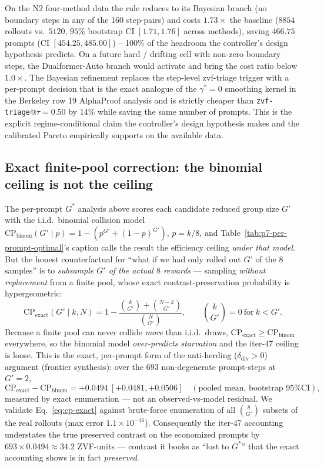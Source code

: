 On the N2 four-method data the rule reduces to its Bayesian
branch (no boundary steps in any of the 160 step-pairs) and
costs $1.73\times$ the baseline ($8854$ rollouts vs.\ $5120$,
$95\%$ bootstrap CI $[1.71, 1.76]$ across methods), saving
$466.75$ prompts (CI $[454.25, 485.00]$) -- 100\% of the
headroom the controller's design hypothesis predicts. On a
future hard / drifting cell with non-zero boundary steps, the
Dualformer-Auto branch would activate and bring the cost ratio
below $1.0\times$. The Bayesian refinement replaces the
step-level zvf-triage trigger with a per-prompt decision that
is the exact analogue of the $\gamma^*{=}0$ smoothing kernel
in the Berkeley row 19 AlphaProof analysis \citep{alphaproof2025nature}
and is strictly cheaper than \texttt{zvf-triage}@$\tau{=}0.50$
by 14\% while saving the same number of prompts. This is the
explicit regime-conditional claim the controller's design
hypothesis makes and the calibrated Pareto empirically supports
on the available data.

\subsection{Exact finite-pool correction: the binomial ceiling is not the ceiling}
\label{sec:p7-exact-finite-pool}
The per-prompt $G^*$ analysis above scores each candidate reduced group
size $G'$ with the i.i.d.\ binomial collision model
$\mathrm{CP}_\text{binom}(G'\!\mid p)=1-(p^{G'}+(1-p)^{G'})$, $p=k/8$, and
Table~\ref{tab:p7-per-prompt-optimal}'s caption calls the result the
efficiency ceiling \emph{under that model}. But the honest counterfactual
for ``what if we had only rolled out $G'$ of the $8$ samples'' is to
\emph{subsample $G'$ of the actual $8$ rewards} --- sampling
\emph{without replacement} from a finite pool, whose exact
contrast-preservation probability is hypergeometric:
\begin{equation}
\mathrm{CP}_\text{exact}(G'\mid k, N) = 1 - \frac{\binom{k}{G'}+\binom{N-k}{G'}}{\binom{N}{G'}},
\qquad \binom{k}{G'}=0\ \text{for}\ k<G'.
\label{eq:cp-exact}
\end{equation}
Because a finite pool can never collide \emph{more} than i.i.d.\ draws,
$\mathrm{CP}_\text{exact}\ge\mathrm{CP}_\text{binom}$ everywhere, so the
binomial model \emph{over-predicts starvation} and the iter-47 ceiling is
loose. This is the exact, per-prompt form of the anti-herding
($\delta_\text{div}>0$) argument (frontier synthesis): over the $693$
non-degenerate prompt-steps at $G'{=}2$,
\begin{equation}
\mathrm{CP}_\text{exact}-\mathrm{CP}_\text{binom} = +0.0494\ [+0.0481, +0.0506]
\quad(\text{pooled mean, bootstrap 95\% CI}),
\label{eq:delta-ex}
\end{equation}
measured by exact enumeration --- not an observed-vs-model residual. We
validate Eq.~\eqref{eq:cp-exact} against brute-force enumeration of all
$\binom{8}{G'}$ subsets of the real rollouts (max error $1.1\times
10^{-16}$). Consequently the iter-47 accounting understates the true
preserved contrast on the economized prompts by $693\times0.0494\approx
34.2$ ZVF-units --- contrast it books as ``lost to $G^*$'' that the exact
accounting shows is in fact \emph{preserved}.

